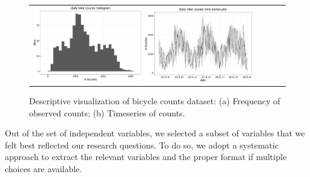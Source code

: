 \documentclass [11pt, proquest] {uwthesis}[2015/03/03]
\begin{document}
\begin{figure}
\begin{tabular}{ll}
\includegraphics[width=0.45\textwidth]{figures/daily_hist}
\includegraphics[width=0.45\textwidth]{figures/daily_tscount_plot}\\
\end{tabular}
\caption{Descriptive visualization of bicycle counts dataset: (a) Frequency of observed counts; (b) Timeseries of counts.}
\label{fig:descriptionbc}
\end{figure}

Out of the set of independent variables, we selected a subset of variables that we felt best reflected our research questions. To do so, we adopt a systematic approach to extract the relevant variables and the proper format if multiple choices are available.
\end{document}
